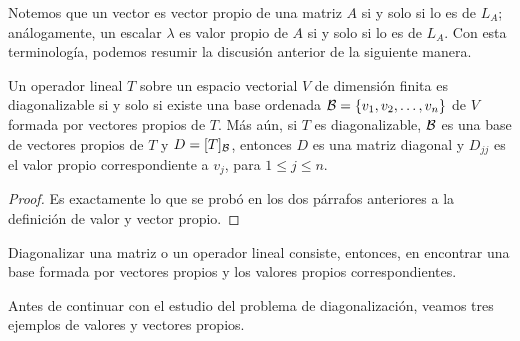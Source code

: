 \documentclass[12pt,a4paper]{book}
\begin{document}
    Notemos que un vector es vector propio de una matriz $A$ si y solo si lo es de $L_A$; análogamente, un escalar $\lambda$ es valor propio de $A$ si y solo si lo es de $L_A$. Con esta terminología, podemos resumir la discusión anterior de la siguiente manera.

    \begin{teorema}
        Un operador lineal $T$ sobre un espacio vectorial $V$ de dimensión finita es diagonalizable si y solo si existe una base ordenada $\mathcal{B} = \{v_1, v_2, \dots, v_n\}$ de $V$ formada por vectores propios de $T$. Más aún, si $T$ es diagonalizable, $\mathcal{B}$ es una base de vectores propios de $T$ y $D = [T]_{\mathcal{B}}$, entonces $D$ es una matriz diagonal y $D_{jj}$ es el valor propio correspondiente a $v_j$, para $1 \leq j \leq n$.
    \end{teorema}

    \begin{proof}
        Es exactamente lo que se probó en los dos párrafos anteriores a la definición de valor y vector propio.
    \end{proof}

    Diagonalizar una matriz o un operador lineal consiste, entonces, en encontrar una base formada por vectores propios y los valores propios correspondientes.

    Antes de continuar con el estudio del problema de diagonalización, veamos tres ejemplos de valores y vectores propios.
\end{document}
